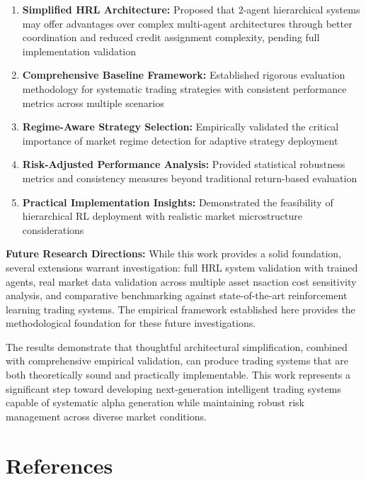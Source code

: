 \documentclass[11pt]{article}
\begin{document}
\begin{enumerate}
\item \textbf{Simplified HRL Architecture:} Proposed that 2-agent hierarchical systems may offer advantages over complex multi-agent architectures through better coordination and reduced credit assignment complexity, pending full implementation validation
\item \textbf{Comprehensive Baseline Framework:} Established rigorous evaluation methodology for systematic trading strategies with consistent performance metrics across multiple scenarios
\item \textbf{Regime-Aware Strategy Selection:} Empirically validated the critical importance of market regime detection for adaptive strategy deployment
\item \textbf{Risk-Adjusted Performance Analysis:} Provided statistical robustness metrics and consistency measures beyond traditional return-based evaluation
\item \textbf{Practical Implementation Insights:} Demonstrated the feasibility of hierarchical RL deployment with realistic market microstructure considerations

\end{enumerate}
\textbf{Future Research Directions:}
While this work provides a solid foundation, several extensions warrant investigation: full HRL system validation with trained agents, real market data validation across multiple asset nsaction cost sensitivity analysis, and comparative benchmarking against state-of-the-art reinforcement learning trading systems. The empirical framework established here provides the methodological foundation for these future investigations.

The results demonstrate that thoughtful architectural simplification, combined with comprehensive empirical validation, can produce trading systems that are both theoretically sound and practically implementable. This work represents a significant step toward developing next-generation intelligent trading systems capable of systematic alpha generation while maintaining robust risk management across diverse market conditions.

\section{References}
\end{document}
